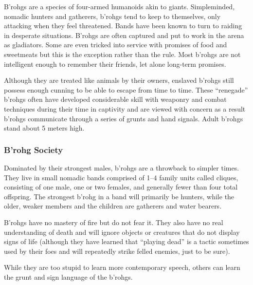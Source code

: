 B'rohgs are a species of four-armed humanoids akin to giants. Simpleminded, nomadic hunters and gatherers, b'rohgs tend to keep to themselves, only attacking when they feel threatened. Bands have been known to turn to raiding in desperate situations. B'rohgs are often captured and put to work in the arena as gladiators. Some are even tricked into service with promises of food and sweetmeats but this is the exception rather than the rule. Most b'rohgs are not intelligent enough to remember their friends, let alone long-term promises.

Although they are treated like animals by their owners, enslaved b'rohgs still possess enough cunning to be able to escape from time to time. These ``renegade'' b'rohgs often have developed considerable skill with weaponry and combat techniques during their time in captivity and are viewed with concern as a result b'rohgs communicate through a series of grunts and hand signals. Adult b'rohgs stand about 5 meters high.

\subsubsection{B'rohg Society}
Dominated by their strongest males, b'rohgs are a throwback to simpler times. They live in small nomadic bands comprised of 1--4 family units called cliques, consisting of one male, one or two females, and generally fewer than four total offspring. The strongest b'rohg in a band will primarily be hunters, while the older, weaker members and the children are gatherers and water bearers.


B'rohgs have no mastery of fire but do not fear it. They also have no real understanding of death and will ignore objects or creatures that do not display signs of life (although they have learned that ``playing dead'' is a tactic sometimes used by their foes and will repeatedly strike felled enemies, just to be sure).

While they are too stupid to learn more contemporary speech, others can learn the grunt and sign language of the b'rohgs.

